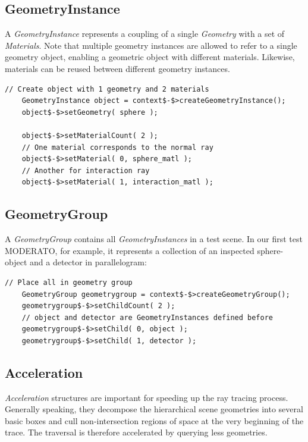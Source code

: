 
\subsection{GeometryInstance}
A \textit{GeometryInstance} represents a coupling of a single \textit{Geometry} with a set of \textit{Materials}. Note that multiple geometry instances are allowed to refer to a single geometry object, enabling a geometric object with different materials. Likewise, materials can be reused between different geometry instances.
\begin{lstlisting}[mathescape]
    // Create object with 1 geometry and 2 materials
    GeometryInstance object = context$-$>createGeometryInstance(); 
    object$-$>setGeometry( sphere );

    object$-$>setMaterialCount( 2 );
    // One material corresponds to the normal ray
    object$-$>setMaterial( 0, sphere_matl );
    // Another for interaction ray
    object$-$>setMaterial( 1, interaction_matl );
\end{lstlisting}


\subsection{GeometryGroup}
A \textit{GeometryGroup} contains all \textit{GeometryInstances} in a test scene. In our first test MODERATO, for example, it represents a collection of an inspected sphere-object and a detector in parallelogram:
\begin{lstlisting}[mathescape]
    // Place all in geometry group
    GeometryGroup geometrygroup = context$-$>createGeometryGroup();
    geometrygroup$-$>setChildCount( 2 );
    // object and detector are GeometryInstances defined before
    geometrygroup$-$>setChild( 0, object );
    geometrygroup$-$>setChild( 1, detector );
\end{lstlisting}


\subsection{Acceleration}
\textit{Acceleration} structures are important for speeding up the ray tracing process. Generally speaking, they decompose the hierarchical scene geometries into several basic boxes and cull non-intersection regions of space at the very beginning of the trace. The traversal is therefore accelerated by querying less geometries.

